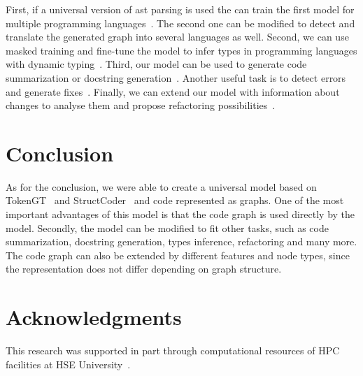\documentclass[sigplan,screen,anonymous,natbib=false]{acmart}
\begin{document}
First, if a universal version of ast parsing is used the can train the first model for multiple programming languages~\cite{wang_unified_2022}.
The second one can be modified to detect and translate the generated graph into several languages as well. 
Second, we can use masked training and fine-tune the model to infer types in programming languages with dynamic typing~\cite{mir_type4py_2021,hellendoorn_deep_2018,malik_nl2type_2019,schrouff_inferring_2019,wei_lambdanet_2020}.
Third, our model can be used to generate code summarization or docstring generation~\cite{barone_parallel_2017,liu_haconvgnn_2021}.
Another useful task is to detect errors and generate fixes~\cite{bhatia_automated_2016,fujimoto_addressing_2018,marginean_sapfix_2019}.
Finally, we can extend our model with information about changes to analyse them and propose refactoring possibilities~\cite{cabrera_lozoya_commit2vec_2021}.

\section{Conclusion}\label{sec:conclusion}

As for the conclusion, we were able to create a universal model based on TokenGT~\cite{kim_pure_2022} and StructCoder~\cite{tipirneni_structcoder_2022} and code represented as graphs.
One of the most important advantages of this model is that the code graph is used directly by the model. 
Secondly, the model can be modified to fit other tasks, such as code summarization, docstring generation, types inference, refactoring and many more. 
The code graph can also be extended by different features and node types, since the representation does not differ depending on graph structure.

\section{Acknowledgments}\label{sec:acknowledgments}

This research was supported in part through computational resources of HPC facilities at HSE University~\cite{kostenetskiy_hpc_2021}.

\printbibliography
\end{document}
